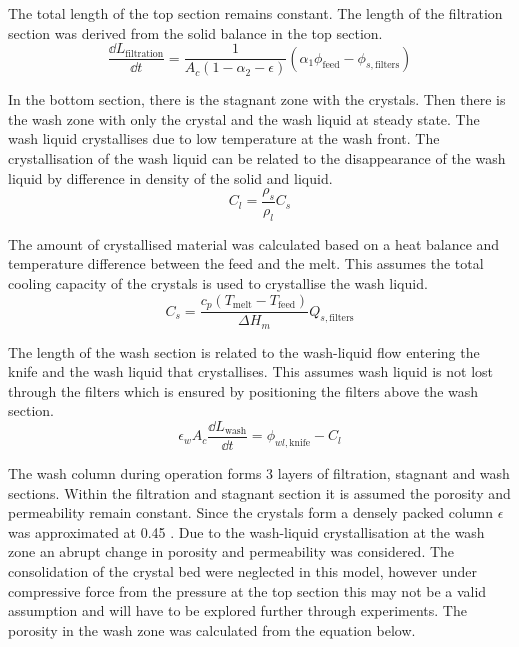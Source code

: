 The total length of the top section remains constant. The length of the filtration section was derived from the solid balance in the top section. 
\begin{equation}
\frac{\dd L_{\mathrm{filtration}}}{\dd t} = \frac{1}{A_c(1-\alpha_2-\epsilon)}(\alpha_1\phi_{\mathrm{feed}}-\phi_{s,\mathrm{filters}})
\end{equation}

In the bottom section, there is the stagnant zone with the crystals. Then there is the wash zone with only the crystal and the wash liquid at steady state. The wash liquid crystallises due to low temperature at the wash front. The crystallisation of the wash liquid can be related to the disappearance of the wash liquid by difference in density of the solid and liquid.
\begin{equation}
C_l= \frac{\rho_s}{\rho_l}C_s
\end{equation}

The amount of crystallised material was calculated based on a heat balance and temperature difference between the feed and the melt. This assumes the total cooling capacity of the crystals is used to crystallise the wash liquid. 
\begin{equation}
C_s= \frac{c_p(T_{\mathrm{melt}}-T_{\mathrm{feed}})}{\Delta H_m}Q_{s,\mathrm{filters}}
\end{equation}

The length of the wash section is related to the wash-liquid flow entering the knife and the wash liquid that crystallises. This assumes wash liquid is not lost through the filters which is ensured by positioning the filters above the wash section.
\begin{equation}
\epsilon_w A_c \frac{\dd L_{\mathrm{wash}}}{\dd t}= \phi_{wl,\mathrm{knife}}-C_l
\end{equation}

The wash column during operation forms 3 layers of filtration, stagnant and wash sections. Within the filtration and stagnant section it is assumed the porosity and permeability remain constant. Since the crystals form a densely packed column $\epsilon$ was approximated at 0.45 \cite{jansens_furification_1995}. Due to the wash-liquid crystallisation at the wash zone an abrupt change in porosity and permeability was considered. The consolidation of the crystal bed were neglected in this model, however under compressive force from the pressure at the top section this may not be a valid assumption and will have to be explored further through experiments. The porosity in the wash zone was calculated from the equation below. 

